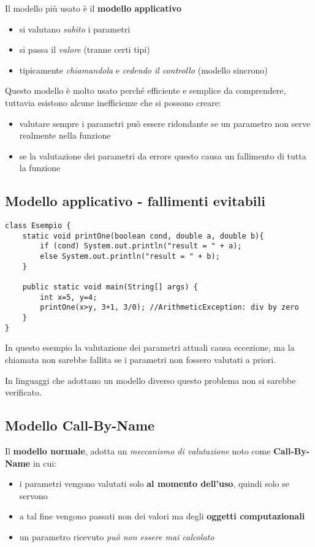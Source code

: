 Il modello più usato è il \textbf{modello applicativo}
\begin{itemize}
    \item si valutano \textit{subito} i parametri
    \item si passa il \textit{valore} (tranne certi tipi)
    \item tipicamente \textit{chiamandola} e \textit{cedendo il controllo} (modello sincrono)
\end{itemize}

Questo modello è molto usato perché efficiente e semplice da comprendere, tuttavia esistono alcune inefficienze che si possono creare:
\begin{itemize}
    \item valutare sempre i parametri può essere ridondante se un parametro non serve realmente nella funzione
    \item se la valutazione dei parametri da errore questo causa un fallimento di tutta la funzione
\end{itemize}

\subsection{Modello applicativo - fallimenti evitabili}
\begin{verbatim}
class Esempio {
    static void printOne(boolean cond, double a, double b){
        if (cond) System.out.println("result = " + a);
        else System.out.println("result = " + b);
    }
    
    public static void main(String[] args) {
        int x=5, y=4;
        printOne(x>y, 3+1, 3/0); //ArithmeticException: div by zero
    }
}
\end{verbatim}
In questo esempio la valutazione dei parametri attuali causa eccezione, ma la chiamata non sarebbe fallita se i parametri non fossero valutati a priori.

In linguaggi che adottano un modello diverso questo problema non si sarebbe verificato.

\subsection{Modello Call-By-Name}
Il \textbf{modello normale}, adotta un \textit{meccanismo di valutazione} noto come \textbf{Call-By-Name} in cui:
\begin{itemize}
    \item i parametri vengono valutati solo \textbf{al momento dell'uso}, quindi solo se servono
    \item a tal fine vengono passati non dei valori ma degli \textbf{oggetti computazionali}
    \item un parametro ricevuto \textit{può non essere mai calcolato}
\end{itemize}

